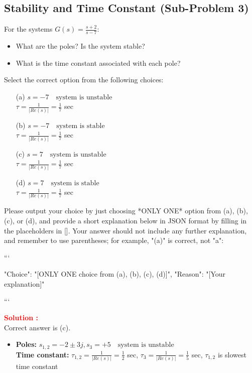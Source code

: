 \documentclass[12pt]{article}
\begin{document}
\subsection*{Stability and Time Constant (Sub-Problem 3)}

For the systems \(G(s) = \frac{s+2}{s-7}\):
\begin{itemize}
    \item What are the poles? Is the system stable?
    \item What is the time constant associated with each pole? 
\end{itemize}

Select the correct option from the following choices:
\begin{itemize}
    \item[(a)] \(s = -7 \quad \text{system is unstable}\)\\
     \(\tau = \frac{1}{|Re(s)|} = \frac{1}{7}\) sec
    \item[(b)] \(s = -7 \quad \text{system is stable}\)\\
     \(\tau = \frac{1}{|Re(s)|} = \frac{1}{7}\) sec
    \item[(c)] \(s = 7 \quad \text{system is unstable}\)\\
     \(\tau = \frac{1}{|Re(s)|} = \frac{1}{7}\) sec
    \item[(d)] \(s = 7 \quad \text{system is stable}\)\\
     \(\tau = \frac{1}{|Re(s)|} = \frac{1}{7}\) sec
\end{itemize}




Please output your choice by just choosing *ONLY ONE* option from (a), (b), (c), or (d), and provide a short explanation below in JSON format by filling in the placeholders in []. Your answer should not include any further explanation, and remember to use parentheses; for example, "(a)" is correct, not "a":

```

{
"Choice": "[ONLY ONE choice from (a), (b), (c), (d)]",
"Reason": "[Your explanation]"
}

```


\textbf{\textcolor{red}{Solution :}} \\
Correct answer is (c).\\
\begin{itemize}
 \item   \textbf{Poles:} \(s_{1,2} = -2 \pm 3j, s_3 = +5 \quad \text{system is unstable}\)\\
    \textbf{Time constant:} \(\tau_{1,2} = \frac{1}{|Re(s)|} = \frac{1}{2}\) sec, \(\tau_3 = \frac{1}{|Re(s)|} = \frac{1}{5}\) sec, \(\tau_{1,2}\) is slowest time constant
\end{itemize}
\clearpage
\end{document}
